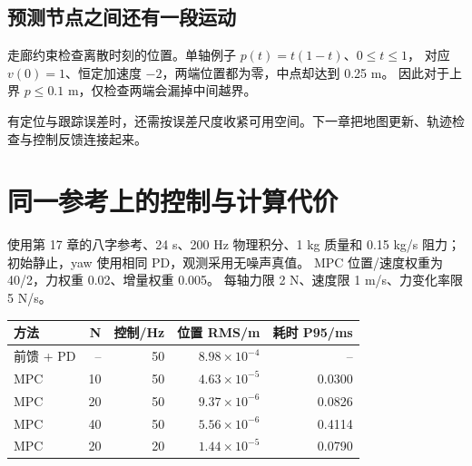\subsection{预测节点之间还有一段运动}
走廊约束检查离散时刻的位置。单轴例子 $p(t)=t(1-t)$、$0\leq t\leq1$，
对应 $v(0)=1$、恒定加速度 $-2$，两端位置都为零，中点却达到 0.25 m。
因此对于上界 $p\leq0.1$ m，仅检查两端会漏掉中间越界。
\begin{center}\begin{minipage}{\linewidth}\makeatletter{}\makeatother
\centering{}
\caption{端点都在走廊内，中间仍可能越界。连续检查可沿用第 14 章的步内加速度界，或第 16 章的多项式凸包界。}
\end{minipage}\end{center}
有定位与跟踪误差时，还需按误差尺度收紧可用空间。下一章把地图更新、轨迹检查与控制反馈连接起来。

\clearpage
\section{同一参考上的控制与计算代价}
使用第 17 章的八字参考、24 s、200 Hz 物理积分、1 kg 质量和 0.15 kg/s 阻力；
初始静止，yaw 使用相同 PD，观测采用无噪声真值。
MPC 位置/速度权重为 40/2，力权重 0.02、增量权重 0.005。
每轴力限 2 N、速度限 1 m/s、力变化率限 5 N/s。
\begin{center}\small
\begin{tabular}{lrrrr}\toprule
方法 & N & 控制/Hz & 位置 RMS/m & 耗时 P95/ms\\\midrule
前馈 + PD & -- & 50 & $8.98\times10^{-4}$ & --\\
MPC & 10 & 50 & $4.63\times10^{-5}$ & 0.0300\\
MPC & 20 & 50 & $9.37\times10^{-6}$ & 0.0826\\
MPC & 40 & 50 & $5.56\times10^{-6}$ & 0.4114\\
MPC & 20 & 20 & $1.44\times10^{-5}$ & 0.0790\\\bottomrule
\end{tabular}
\end{center}

